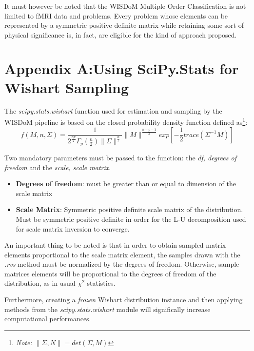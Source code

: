 \documentclass[12pt,openright,twoside,a4paper]{book}
\begin{document}
It must however be noted that the WISDoM Multiple Order Classification is not limited to fMRI data and problems.
Every problem whose elements can be represented by a symmetric positive definite matrix while retaining some sort of physical significance is, in fact, are eligible for the kind of approach proposed.

\appendix

\chapter{Appendix A:Using SciPy.Stats for Wishart Sampling}

The \textit{scipy.stats.wishart} function used for estimation and sampling by the WISDoM pipeline is based on the closed probability density function defined as\footnote{\textit{Note: $\|\Sigma , N \| = det (\Sigma , M)$}}:
\begin{equation}
f(M, n, \Sigma)=\frac{1}{2^{\frac{np}{2}}\Gamma_p(\frac{n}{2})\|\Sigma\|^{\frac{n}{2}}}\|M\|^{\frac{n-p-1}{2}}exp[-\frac{1}{2}trace(\Sigma^{-1}M)]
\end{equation} 

Two mandatory parameters must be passed to the function: the \textit{df, degrees of freedom} and the \textit{scale, scale matrix}.
\begin{itemize}
\item \textbf{Degrees of freedom}: must be greater than or equal to dimension of the scale matrix
\item
\textbf{Scale Matrix}: Symmetric positive definite scale matrix of the distribution. Must be symmetric positive definite in order for the L-U decomposition used for scale matrix inversion to converge.
\end{itemize}

An important thing to be noted is that in order to obtain sampled matrix elements proportional to the scale matrix element, the samples drawn with the \textit{.rvs} method must be normalized by the degrees of freedom. Otherwise, sample matrices elements will be proportional to the degrees of freedom of the distribution, as in usual $\chi^2$ statistics.

Furthermore, creating a \textit{frozen} Wishart distribution instance and then applying methods from the \textit{scipy.stats.wishart} module will significally increase computational performances.
\end{document}
